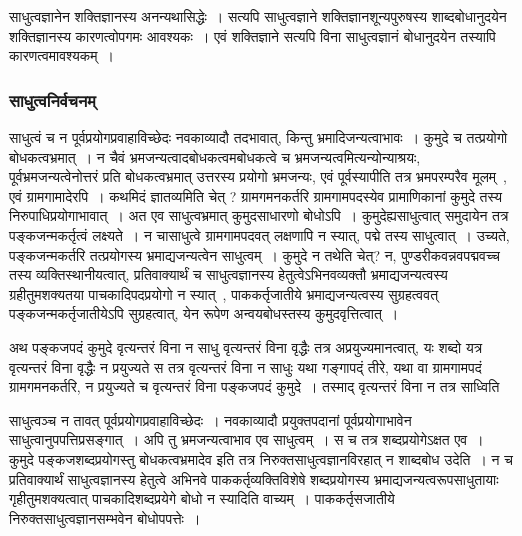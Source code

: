 				साधुत्वज्ञानेन शक्तिज्ञानस्य अनन्यथासिद्धेः~। सत्यपि साधुत्वज्ञाने शक्तिज्ञानशून्यपुरुषस्य शाब्दबोधानुदयेन शक्तिज्ञानस्य कारणत्वोपगमः आवश्यकः~। एवं शक्तिज्ञाने सत्यपि विना साधुत्वज्ञानं बोधानुदयेन तस्यापि कारणत्वमावश्यकम्~। 
			
			\subsubsection{साधुत्वनिर्वचनम्}
			
				\begin{small}
			
					साधुत्वं च न पूर्वप्रयोगप्रवाहाविच्छेदः नवकाव्यादौ तदभावात्, किन्तु भ्रमादिजन्यत्वाभावः~। कुमुदे च तत्प्रयोगो बोधकत्वभ्रमात्~।  न चैवं भ्रमजन्यत्वादबोधकत्वमबोधकत्वे च भ्रमजन्यत्वमित्यन्योन्याश्रयः, पूर्वभ्रमजन्यत्वेनोत्तरं प्रति बोधकत्वभ्रमात् उत्तरस्य प्रयोगो भ्रमजन्यः, एवं पूर्वस्यापीति तत्र भ्रमपरम्परैव मूलम्~, एवं ग्रामगामादेरपि~। कथमिदं ज्ञातव्यमिति चेत् ? ग्रामगमनकर्तरि  ग्रामगामपदस्येव प्रामाणिकानां कुमुदे तस्य निरुपाधिप्रयोगाभावात्~। अत एव साधुत्वभ्रमात् कुमुदसाधारणो बोधोऽपि~।  कुमुदेह्यसाधुत्वात् समुदायेन तत्र पङ्कजन्मकर्तृत्वं लक्ष्यते~। न चासाधुत्वे ग्रामगामपदवत् लक्षणापि न स्यात्, पद्मे तस्य साधुत्वात्~। उच्यते, पङ्कजन्मकर्तरि तत्प्रयोगस्य भ्रमाद्यजन्यत्वेन साधुत्वम्~। कुमुदे न तथेति चेत्? न, पुण्डरीकवन्नवपद्मवच्च तस्य व्यक्तिस्थानीयत्वात्, प्रतिवाक्यार्थं च साधुत्वज्ञानस्य हेतुत्वेऽभिनवव्यक्तौ भ्रमाद्यजन्यत्वस्य ग्रहीतुमशक्यतया पाचकादिपदप्रयोगो न स्यात्~, पाककर्तृजातीये भ्रमाद्यजन्यत्वस्य सुग्रहत्ववत् पङ्कजन्मकर्तृजातीयेऽपि सुग्रहत्वात्, येन रूपेण अन्वयबोधस्तस्य कुमुदवृत्तित्वात्~।           
   
					अथ पङ्कजपदं कुमुदे वृत्यन्तरं विना न साधु वृत्यन्तरं विना वृद्धैः तत्र अप्रयुज्यमानत्वात्, यः शब्दो यत्र वृत्यन्तरं विना वृद्धैः न प्रयुज्यते स तत्र वृत्यन्तरं विना न साधुः यथा गङ्गापद्ं तीरे, यथा वा ग्रामगामपदं ग्रामगमनकर्तरि, न प्रयुज्यते च वृत्यन्तरं विना पङ्कजपदं कुमुदे~। तस्माद् वृत्यन्तरं विना न तत्र साध्विति 
				\end{small}
			
				साधुत्वञ्च न तावत् पूर्वप्रयोगप्रवाहाविच्छेदः~। नवकाव्यादौ प्रयुक्तपदानां पूर्वप्रयोगाभावेन साधुत्वानुपपत्तिप्रसङ्गात्~। अपि तु भ्रमजन्यत्वाभाव एव साधुत्वम्~। स च तत्र शब्दप्रयोगेऽक्षत एव~। कुमुदे पङ्कजशब्दप्रयोगस्तु बोधकत्वभ्रमादेव इति तत्र निरुक्तसाधुत्वज्ञानविरहात् न शाब्दबोध उदेति~। न च प्रतिवाक्यार्थं साधुत्वज्ञानस्य हेतुत्वे अभिनवे पाककर्तृव्यक्तिविशेषे शब्दप्रयोगस्य भ्रमाद्यजन्यत्वरूपसाधुतायाः गृहीतुमशक्यत्वात् पाचकादिशब्दप्रयेगे बोधो न स्यादिति वाच्यम्~। पाककर्तृसजातीये निरुक्तसाधुत्वज्ञानसम्भवेन बोधोपपत्तेः~। 
	
